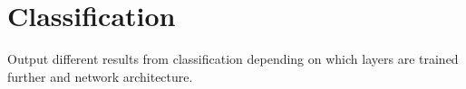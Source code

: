 %

\section{Classification}
Output different results from classification depending on which layers are trained further and network architecture.

